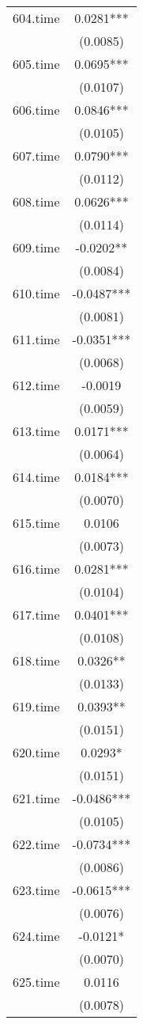 \documentclass[]{article}
\begin{document}
\begin{tabular}{lc}
604.time & 0.0281*** \\
 & (0.0085) \\
605.time & 0.0695*** \\
 & (0.0107) \\
606.time & 0.0846*** \\
 & (0.0105) \\
607.time & 0.0790*** \\
 & (0.0112) \\
608.time & 0.0626*** \\
 & (0.0114) \\
609.time & -0.0202** \\
 & (0.0084) \\
610.time & -0.0487*** \\
 & (0.0081) \\
611.time & -0.0351*** \\
 & (0.0068) \\
612.time & -0.0019 \\
 & (0.0059) \\
613.time & 0.0171*** \\
 & (0.0064) \\
614.time & 0.0184*** \\
 & (0.0070) \\
615.time & 0.0106 \\
 & (0.0073) \\
616.time & 0.0281*** \\
 & (0.0104) \\
617.time & 0.0401*** \\
 & (0.0108) \\
618.time & 0.0326** \\
 & (0.0133) \\
619.time & 0.0393** \\
 & (0.0151) \\
620.time & 0.0293* \\
 & (0.0151) \\
621.time & -0.0486*** \\
 & (0.0105) \\
622.time & -0.0734*** \\
 & (0.0086) \\
623.time & -0.0615*** \\
 & (0.0076) \\
624.time & -0.0121* \\
 & (0.0070) \\
625.time & 0.0116 \\
 & (0.0078) \\

\end{tabular}
\end{document}

